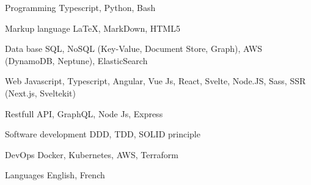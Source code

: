 


\begin{cvskills}


\cvskill
{Programming} %
{Typescript, Python, Bash} %


\cvskill
{Markup language} %
{LaTeX, MarkDown, HTML5} %



\cvskill
{Data base} %
{SQL, NoSQL (Key-Value, Document Store, Graph), AWS (DynamoDB, Neptune), ElasticSearch} %


\cvskill
{Web} %
{Javascript, Typescript, Angular, Vue Js, React, Svelte, Node.JS, Sass, SSR (Next.js, Sveltekit) } %


\cvskill
{} %
{Restfull API, GraphQL, Node Js, Express} %




\cvskill
{Software development} %
{DDD, TDD, SOLID principle} %



\cvskill
{DevOps} %
{Docker, Kubernetes, AWS, Terraform} %


\cvskill
{Languages} %
{English, French} %


\end{cvskills}